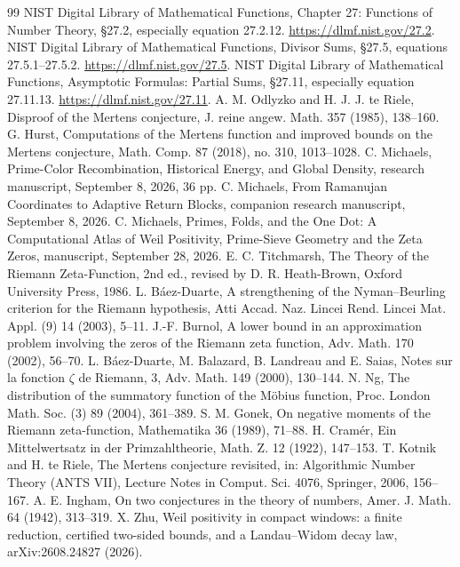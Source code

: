 \documentclass[11pt]{article}
\theoremstyle{definition}
\theoremstyle{remark}
\begin{document}
\begin{thebibliography}{99}
 NIST Digital Library of Mathematical Functions, Chapter 27: Functions of Number Theory, \S27.2, especially equation 27.2.12. \url{https://dlmf.nist.gov/27.2}.
 NIST Digital Library of Mathematical Functions, Divisor Sums, \S27.5, equations 27.5.1--27.5.2. \url{https://dlmf.nist.gov/27.5}.
 NIST Digital Library of Mathematical Functions, Asymptotic Formulas: Partial Sums, \S27.11, especially equation 27.11.13. \url{https://dlmf.nist.gov/27.11}.
 A. M. Odlyzko and H. J. J. te Riele, Disproof of the Mertens conjecture, J. reine angew. Math. 357 (1985), 138--160.
 G. Hurst, Computations of the Mertens function and improved bounds on the Mertens conjecture, Math. Comp. 87 (2018), no. 310, 1013--1028.
 C. Michaels, Prime-Color Recombination, Historical Energy, and Global Density, research manuscript, September 8, 2026, 36 pp.
 C. Michaels, From Ramanujan Coordinates to Adaptive Return Blocks, companion research manuscript, September 8, 2026.
 C. Michaels, Primes, Folds, and the One Dot: A Computational Atlas of Weil Positivity, Prime-Sieve Geometry and the Zeta Zeros, manuscript, September 28, 2026.
 E. C. Titchmarsh, The Theory of the Riemann Zeta-Function, 2nd ed., revised by D. R. Heath-Brown, Oxford University Press, 1986.
 L. B\'aez-Duarte, A strengthening of the Nyman--Beurling criterion for the Riemann hypothesis, Atti Accad. Naz. Lincei Rend. Lincei Mat. Appl. (9) 14 (2003), 5--11.
 J.-F. Burnol, A lower bound in an approximation problem involving the zeros of the Riemann zeta function, Adv. Math. 170 (2002), 56--70.
 L. B\'aez-Duarte, M. Balazard, B. Landreau and E. Saias, Notes sur la fonction $\zeta$ de Riemann, 3, Adv. Math. 149 (2000), 130--144.
 N. Ng, The distribution of the summatory function of the M\"obius function, Proc. London Math. Soc. (3) 89 (2004), 361--389.
 S. M. Gonek, On negative moments of the Riemann zeta-function, Mathematika 36 (1989), 71--88.
 H. Cram\'er, Ein Mittelwertsatz in der Primzahltheorie, Math. Z. 12 (1922), 147--153.
 T. Kotnik and H. te Riele, The Mertens conjecture revisited, in: Algorithmic Number Theory (ANTS VII), Lecture Notes in Comput. Sci. 4076, Springer, 2006, 156--167.
 A. E. Ingham, On two conjectures in the theory of numbers, Amer. J. Math. 64 (1942), 313--319.
 X. Zhu, Weil positivity in compact windows: a finite reduction, certified two-sided bounds, and a Landau--Widom decay law, arXiv:2608.24827 (2026).
\end{thebibliography}
\end{document}
